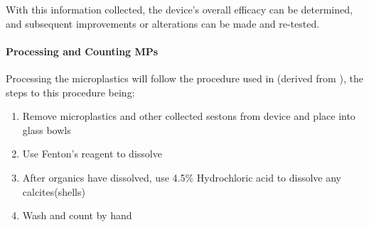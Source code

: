 \documentclass[fleqn,10pt]{SelfArx} %
\begin{document}
	With this information collected, the device’s overall efficacy can be determined, and subsequent improvements or alterations can be made and re-tested.
	
	\paragraph*{Processing and Counting MPs}
	Processing the microplastics will follow the procedure used in \cite{LenakerEtAlvertdist}(derived from \cite{Zobkov_Esiukova_2016}), the steps to this procedure being:
	\begin{enumerate}
		\item Remove microplastics and other collected sestons from device and place into glass bowls 
		\item Use Fenton's reagent to dissolve  
		\item After organics have dissolved, use 4.5\% Hydrochloric acid to dissolve any calcites(shells)
		\item Wash and count by hand
	\end{enumerate}
	
\end{document}
